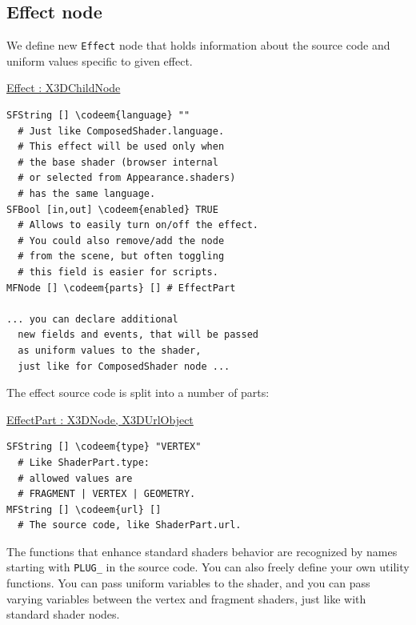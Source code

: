 \documentclass{acmsiggraph}                     %
\newenvironment{mycode}
{\begin{mycodecore}}
{\end{mycodecore}
\vspace{-0.1in}}
\newcommand*{\codeem}[1]{\textbf{#1}}
\begin{document}
\subsection{Effect node}

We define new \texttt{Effect} node that holds information about
the source code and uniform values specific to given effect.

\begin{mycode}
\underline{Effect : X3DChildNode}
\begin{Verbatim}[commandchars=\\\{\}]
SFString [] \codeem{language} ""
  # Just like ComposedShader.language.
  # This effect will be used only when
  # the base shader (browser internal
  # or selected from Appearance.shaders)
  # has the same language.
SFBool [in,out] \codeem{enabled} TRUE
  # Allows to easily turn on/off the effect.
  # You could also remove/add the node
  # from the scene, but often toggling
  # this field is easier for scripts.
MFNode [] \codeem{parts} [] # EffectPart

... you can declare additional
  new fields and events, that will be passed
  as uniform values to the shader,
  just like for ComposedShader node ...
\end{Verbatim}
\end{mycode}

\needspace{1in}
The effect source code is split into a number of parts:

\begin{mycode}
\underline{EffectPart : X3DNode, X3DUrlObject}
\begin{Verbatim}[commandchars=\\\{\}]
SFString [] \codeem{type} "VERTEX"
  # Like ShaderPart.type:
  # allowed values are
  # FRAGMENT | VERTEX | GEOMETRY.
MFString [] \codeem{url} []
  # The source code, like ShaderPart.url.
\end{Verbatim}
\end{mycode}


The functions that enhance standard shaders behavior are recognized
by names starting with \texttt{PLUG\_} in the source code.
You can also freely define your own utility functions.
You can pass uniform variables to the shader,
and you can pass varying variables between the vertex and fragment
shaders, just like with standard shader nodes.
\end{document}

